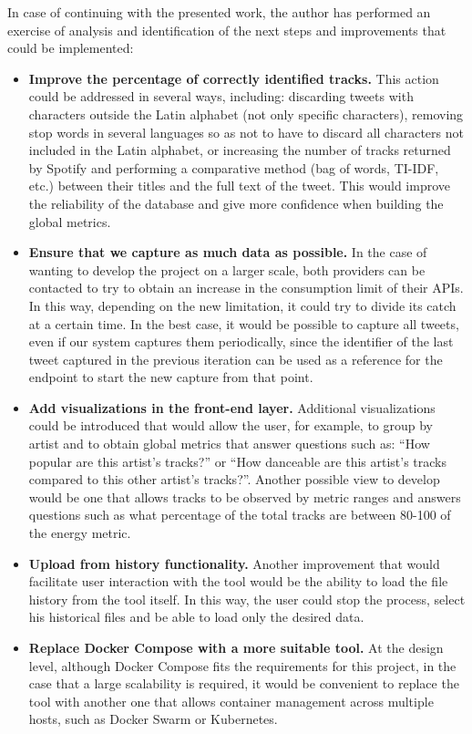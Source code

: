 \nonzeroparskip In case of continuing with the presented work, the author has performed an exercise of analysis and identification of the next steps and improvements that could be implemented:
\begin{itemize}
	\item \textbf{Improve the percentage of correctly identified tracks.} This action could be addressed in several ways, including: discarding tweets with characters outside the Latin alphabet (not only specific characters), removing stop words in several languages so as not to have to discard all characters not included in the Latin alphabet, or increasing the number of tracks returned by Spotify and performing a comparative method (bag of words, TI-IDF, etc.) between their titles and the full text of the tweet. This would improve the reliability of the database and give more confidence when building the global metrics.
	\item \textbf{Ensure that we capture as much data as possible.} In the case of wanting to develop the project on a larger scale, both providers can be contacted to try to obtain an increase in the consumption limit of their APIs. In this way, depending on the new limitation, it could try to divide its catch at a certain time. In the best case, it would be possible to capture all tweets, even if our system captures them periodically, since the identifier of the last tweet captured in the previous iteration can be used as a reference for the endpoint to start the new capture from that point.
	\item \textbf{Add visualizations in the front-end layer.} Additional visualizations could be introduced that would allow the user, for example, to group by artist and to obtain global metrics that answer questions such as: ``How popular are this artist's tracks?'' or ``How danceable are this artist's tracks compared to this other artist's tracks?''. Another possible view to develop would be one that allows tracks to be observed by metric ranges and answers questions such as what percentage of the total tracks are between 80-100 of the energy metric.
	\item \textbf{Upload from history functionality.} Another improvement that would facilitate user interaction with the tool would be the ability to load the file history from the tool itself. In this way, the user could stop the process, select his historical files and be able to load only the desired data.
	\item \textbf{Replace Docker Compose with a more suitable tool.} At the design level, although Docker Compose fits the requirements for this project, in the case that a large scalability is required, it would be convenient to replace the tool with another one that allows container management across multiple hosts, such as Docker Swarm or Kubernetes.

\end{itemize}
